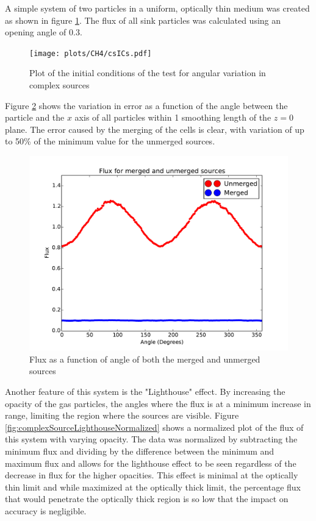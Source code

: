 \iffalse


A simple system of two particles in a uniform, optically thin medium was created as shown in figure \ref{fig:complexSource}. The flux of all sink particles was calculated using an opening angle of 0.3. 
\begin{figure} [H]
    \centering
    \texttt{[image: plots/CH4/csICs.pdf]}
    \caption{Plot of the initial conditions of the test for angular variation in complex sources}
    \label{fig:complexSource}
\end{figure}
Figure \ref{fig:complexSourceAngleVariation} shows the variation in error as a function of the angle between the particle and the $x$ axis of all particles within 1 smoothing length of the $z=0$ plane. The error caused by the merging of the cells is clear, with variation of up to 50\% of the minimum value for the unmerged sources. 
\begin{figure} [H]
    \centering
    \includegraphics[width=\textwidth]{plots/CH4/csFlux.pdf}
    \caption{Flux as a function of angle of both the merged and unmerged sources}
    \label{fig:complexSourceAngleVariation}
\end{figure}
Another feature of this system is the "Lighthouse" effect. By increasing the opacity of the gas particles, the angles where the flux is at a minimum increase in range, limiting the region where the sources are visible. Figure \ref{fig:complexSourceLighthouseNormalized} shows a normalized plot of the flux of this system with varying opacity. The data was normalized by subtracting the minimum flux and dividing by the difference between the minimum and maximum flux and allows for the lighthouse effect to be seen regardless of the decrease in flux for the higher opacities. This effect is minimal at the optically thin limit and while maximized at the optically thick limit, the percentage flux that would penetrate the optically thick region is so low that the impact on accuracy is negligible. 
